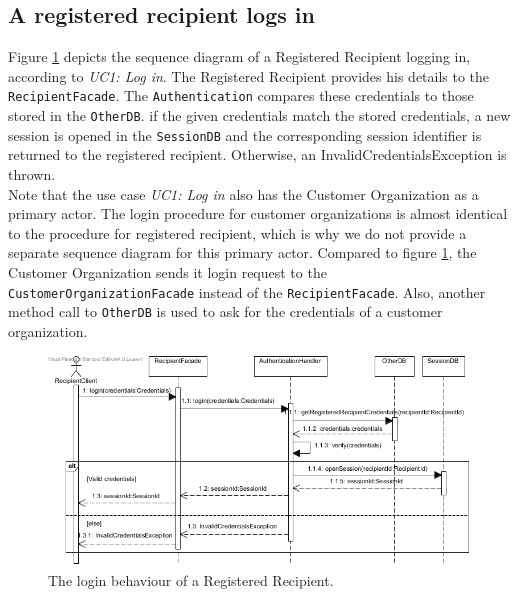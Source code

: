 \documentclass[a4paper,10pt]{article}
\begin{document}
\subsection{A registered recipient logs in}
\label{scenario:RegRecipLogIn}
Figure \ref{fig:seq_UC1LogIn} depicts the sequence diagram of a Registered Recipient logging in, according to \emph{UC1: Log in}. The Registered Recipient provides his details to the \texttt{RecipientFacade}. The \texttt{Authentication} compares these credentials to those stored in the \texttt{OtherDB}. if the given credentials match the stored credentials, a new session is opened in the \texttt{SessionDB} and the corresponding session identifier is returned to the registered recipient. Otherwise, an InvalidCredentialsException is thrown.\\
Note that the use case \emph{UC1: Log in} also has the Customer Organization as a primary actor. The login procedure for customer organizations is almost identical to the procedure for registered recipient, which is why we do not provide a separate sequence diagram for this primary actor. Compared to figure \ref{fig:seq_UC1LogIn}, the Customer Organization sends it login request to the \texttt{CustomerOrganizationFacade} instead of the \texttt{RecipientFacade}. Also, another method call to \texttt{OtherDB} is used to ask for the credentials of a customer organization.
\begin{figure}[!htp]
    \centering
    \includegraphics[width=\textwidth]{Seq_UC1LogIn.png}
    \caption{The login behaviour of a Registered Recipient.
        }\label{fig:seq_UC1LogIn}
\end{figure}
\end{document}
